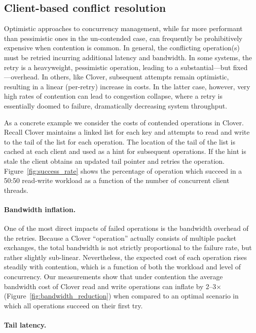 \subsection{Client-based conflict resolution}

Optimistic approaches to concurrency management, while far more
performant than pessimistic ones in the un-contended case, can
frequently be prohibitively expensive when contention is common.  In
general, the conflicting operation(s) must be retried incurring
additional latency and bandwidth.  In some systems, the retry is a
heavyweight, pessimistic operation, leading to a substantial---but
fixed---overhead.  In others, like Clover, subsequent attempts remain
optimistic, resulting in a linear (per-retry) increase in costs.
In the latter case, however, very high rates of contention can lead to
congestion collapse, where a retry is essentially doomed to failure,
dramatically decreasing system throughput.

As a concrete example we consider the costs of contended operations in
Clover.  Recall Clover maintains a linked list for each key and
attempts to read and write to the tail of the list for each
operation. The location of the tail of the list is cached at each
client and used as a hint for subsequent operations.  If the hint is
stale the client obtains an updated tail pointer and retries the
operation.  Figure~\ref{fig:success_rate} shows the percentage of
operation which succeed in a 50:50 read-write workload as a
function of the number of concurrent client threads.

\paragraph{Bandwidth inflation.} 

One of the most direct impacts of failed operations is the bandwidth
overhead of the retries.  Because a Clover ``operation'' actually
consists of multiple packet exchanges, the total bandwidth is not
strictly proportional to the failure rate, but rather slightly
sub-linear.  Nevertheless, the expected cost of each operation rises
steadily with contention, which is a function of both the workload and
level of concurrency.  Our measurements show that under contention the
average bandwidth cost of Clover read and write operations can inflate
by 2--3$\times$ (Figure~\ref{fig:bandwidth_reduction}) when compared
to an optimal scenario in which all operations succeed on their first
try.

\paragraph{Tail latency.}

